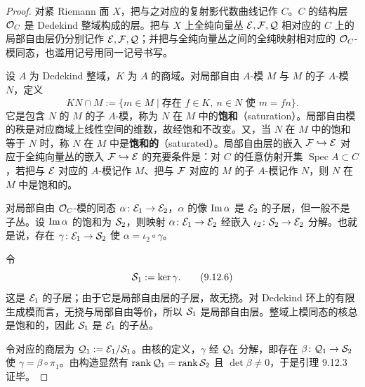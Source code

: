 \begin{proof}
  对紧 Riemann 面 $X$，把与之对应的复射影代数曲线记作 $C$。$C$ 的结构层 $\mathcal{O}_C$ 是 Dedekind 整域构成的层。把与 $X$ 上全纯向量丛 $\mathcal{E},\mathcal{F},\mathcal{Q}$ 相对应的 $C$ 上的局部自由层仍分别记作 $\mathcal{E},\mathcal{F},\mathcal{Q}$；并把与全纯向量丛之间的全纯映射相对应的 $\mathcal{O}_C$-模同态，也滥用记号用同一记号书写。

  设 $A$ 为 Dedekind 整域，$K$ 为 $A$ 的商域。对局部自由 $A$-模 $M$ 与 $M$ 的子 $A$-模 $N$，定义
  \begin{equation}
    KN\cap M:=\{m\in M\mid \text{存在 } f\in K,\ n\in N \text{ 使 } m=fn\}.
    \tag{9.12.5}
  \end{equation}
  它是包含 $N$ 的 $M$ 的子 $A$-模，称为 $N$ 在 $M$ 中的\textbf{饱和}（saturation）。局部自由模的秩是对应商域上线性空间的维数，故经饱和不改变。又，当 $N$ 在 $M$ 中的饱和等于 $N$ 时，称 $N$ 在 $M$ 中是\textbf{饱和的}（saturated）。局部自由层的嵌入 $\mathcal{F}\hookrightarrow\mathcal{E}$ 对应于全纯向量丛的嵌入 $\mathcal{F}\hookrightarrow\mathcal{E}$ 的充要条件是：对 $C$ 的任意仿射开集 $\operatorname{Spec}A\subset C$，若把与 $\mathcal{E}$ 对应的 $A$-模记作 $M$、把与 $\mathcal{F}$ 对应的 $M$ 的子 $A$-模记作 $N$，则 $N$ 在 $M$ 中是饱和的。


  对局部自由 $\mathcal{O}_C$-模的同态 $\alpha\colon\mathcal{E}_1\to\mathcal{E}_2$，$\alpha$ 的像 $\operatorname{Im}\alpha$ 是 $\mathcal{E}_2$ 的子层，但一般不是子丛。设 $\operatorname{Im}\alpha$ 的饱和为 $\mathcal{S}_2$，则映射 $\alpha\colon\mathcal{E}_1\to\mathcal{E}_2$ 经嵌入 $\iota_2\colon\mathcal{S}_2\to\mathcal{E}_2$ 分解。也就是说，存在 $\gamma\colon\mathcal{E}_1\to\mathcal{S}_2$ 使 $\alpha=\iota_2\circ\gamma$。


  令
  \begin{equation}
    \mathcal{S}_1:=\ker\gamma .
    \tag{9.12.6}
  \end{equation}
  这是 $\mathcal{E}_1$ 的子层；由于它是局部自由层的子层，故无挠。对 Dedekind 环上的有限生成模而言，无挠与局部自由等价，所以 $\mathcal{S}_1$ 是局部自由层。整域上模同态的核总是饱和的，因此 $\mathcal{S}_1$ 是 $\mathcal{E}_1$ 的子丛。

  令对应的商层为 $\mathcal{Q}_1:=\mathcal{E}_1/\mathcal{S}_1$。由核的定义，$\gamma$ 经 $\mathcal{Q}_1$ 分解，即存在 $\beta\colon\mathcal{Q}_1\to\mathcal{S}_2$ 使 $\gamma=\beta\circ\pi_1$。由构造显然有 $\operatorname{rank}\mathcal{Q}_1=\operatorname{rank}\mathcal{S}_2$ 且 $\det\beta\ne0$，于是引理 9.12.3 证毕。
\end{proof}

